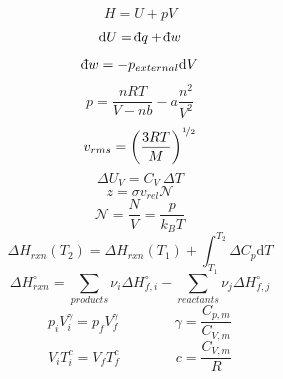 \documentclass[12pt, letterpaper]{memoir}
\begin{document}
\noindent
\begin{minipage}{0.5\linewidth}
	\begin{equation*}
		H = U + pV
	\end{equation*}
	\begin{equation*}
		\mathrm{d} U = \dbar q + \dbar w
	\end{equation*}
	\begin{equation*}
		\dbar w = -p_{external} \mathrm{d}V
	\end{equation*}
	\begin{equation*}
		p = \frac{nRT}{V-nb} - a\frac{n^2}{V^2}
	\end{equation*}
	\begin{equation*}
		v_{rms} = \left(\frac{3RT}{M}\right)^{\nicefrac{1}{2}}
	\end{equation*}
	\begin{equation*}
		\Delta U_V = C_V~\Delta T
	\end{equation*}
	\begin{equation*}
		z = \sigma v_{rel}\mathcal{N}
	\end{equation*}
	\begin{equation*}
		\mathcal{N} = \frac{N}{V}=\frac{p}{k_BT}
	\end{equation*}
	\begin{equation*}
		\Delta H_{rxn}(T_2) = \Delta H_{rxn}(T_1) + \int_{T_1}^{T_2} \! \Delta C_{p}\mathrm{d}T
	\end{equation*}
	\begin{equation*}
		\Delta H^\circ_{rxn} = \sum\limits_{products} \nu_i\Delta H^\circ_{f,i} - \sum\limits_{reactants} \nu_j\Delta H^\circ_{f,j}
	\end{equation*}
	\begin{equation*}
		p_iV_i^\gamma = p_fV_f^\gamma \hspace{4em} \gamma = \dfrac{C_{p,m}}{C_{V,m}}
	\end{equation*}
	\begin{equation*}
		V_iT_i^c=V_fT_f^c \hspace{4em} c=\dfrac{C_{V,m}}{R}
	\end{equation*}
\end{minipage}
\end{document}
